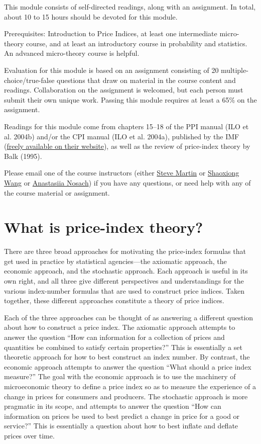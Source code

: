 \documentclass[
]{article}
\begin{document}
This module consists of self-directed readings, along with an assignment. In total, about 10 to 15 hours should be devoted for this module.

Prerequisites: Introduction to Price Indices, at least one intermediate micro-theory course, and at least an introductory course in probability and statistics. An advanced micro-theory course is helpful.

Evaluation for this module is based on an assignment consisting of 20 multiple-choice/true-false questions that draw on material in the course content and readings. Collaboration on the assignment is welcomed, but each person must submit their own unique work. Passing this module requires at least a 65\% on the assignment.

Readings for this module come from chapters 15--18 of the PPI manual (ILO et al. 2004b) and/or the CPI manual (ILO et al. 2004a), published by the IMF (\href{https://www.imf.org/en/Publications/Manuals-Guides/Issues/2016/12/30/Producer-Price-Index-Manual-Theory-and-Practice-16966}{freely available on their website}), as well as the review of price-index theory by Balk (1995).

Please email one of the course instructors (either \href{mailto:steve.martin5@canada.ca}{Steve Martin} or \href{mailto:shaoxiong.wang@canada.ca}{Shaoxiong Wang} or \href{mailto:anastasiia.nosach@canada.ca}{Anastasiia Nosach}) if you have any questions, or need help with any of the course material or assignment.

\hypertarget{what-is-price-index-theory}{%
\section{What is price-index theory?}\label{what-is-price-index-theory}}

There are three broad approaches for motivating the price-index formulas that get used in practice by statistical agencies---the axiomatic approach, the economic approach, and the stochastic approach. Each approach is useful in its own right, and all three give different perspectives and understandings for the various index-number formulas that are used to construct price indices. Taken together, these different approaches constitute a theory of price indices.

Each of the three approaches can be thought of as answering a different question about how to construct a price index. The axiomatic approach attempts to answer the question ``How can information for a collection of prices and quantities be combined to satisfy certain properties?'' This is essentially a set theoretic approach for how to best construct an index number. By contrast, the economic approach attempts to answer the question ``What should a price index measure?'' The goal with the economic approach is to use the machinery of microeconomic theory to define a price index so as to measure the experience of a change in prices for consumers and producers. The stochastic approach is more pragmatic in its scope, and attempts to answer the question ``How can information on prices be used to best predict a change in price for a good or service?'' This is essentially a question about how to best inflate and deflate prices over time.
\end{document}
